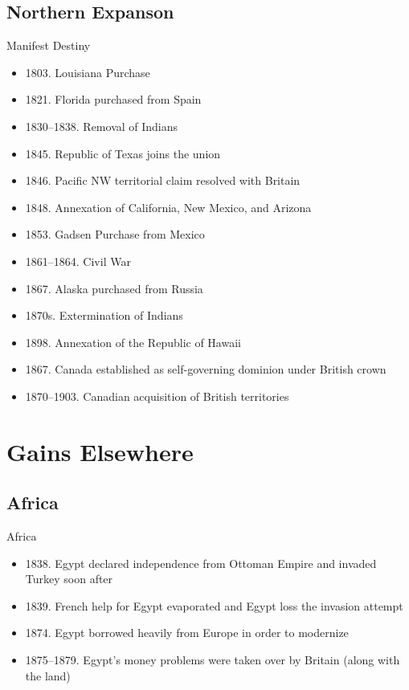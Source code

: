 \subsection{Northern Expanson}
\begin{frame}{Manifest Destiny}
	\begin{itemize}
		\item<2-8,10->1803. Louisiana Purchase
		\item<3-8,10->1821. Florida purchased from Spain
		\item<4-8,10->1830--1838. Removal of Indians
		\item<5-8,10->1845. Republic of Texas joins the union
		\item<6-8,10->1846. Pacific NW territorial claim resolved with Britain
		\item<7-8,10->1848. Annexation of California, New Mexico, and Arizona
		\item<8,10->1853. Gadsen Purchase from Mexico
		\item<10->1861--1864. Civil War
		\item<11->1867. Alaska purchased from Russia
		\item<12->1870s. Extermination of Indians
		\item<13->1898. Annexation of the Republic of Hawaii
		\item<14->1867. Canada established as self-governing dominion under British crown
		\item<15->1870--1903. Canadian acquisition of British territories
	\end{itemize}
\end{frame}

\section{Gains Elsewhere}
\subsection{Africa}
\begin{frame}{Africa}
	\begin{itemize}
		\item<2-5>1838. Egypt declared independence from Ottoman Empire and invaded Turkey soon after
		\item<3-5>1839. French help for Egypt evaporated and Egypt loss the invasion attempt
		\item<4-5>1874. Egypt borrowed heavily from Europe in order to modernize
		\item<5>1875--1879. Egypt's money problems were taken over by Britain (along with the land)
	\end{itemize}
\end{frame}

